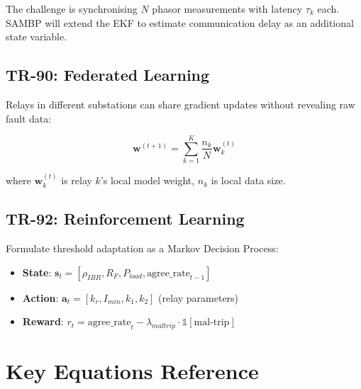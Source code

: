 \documentclass[11pt,a4paper]{report}
\newcommand{\bvec}[1]{\mathbf{#1}}
\begin{document}
The challenge is synchronising $N$ phasor measurements with latency $\tau_k$ each. SAMBP will extend the EKF to estimate communication delay as an additional state variable.

\section{TR-90: Federated Learning}

Relays in different substations can share gradient updates without revealing raw fault data:

\begin{equation}
\bvec{w}^{(t+1)} = \sum_{k=1}^{K}\frac{n_k}{N}\bvec{w}_k^{(t)}
\end{equation}

where $\bvec{w}_k^{(t)}$ is relay $k$'s local model weight, $n_k$ is local data size.

\section{TR-92: Reinforcement Learning}

Formulate threshold adaptation as a Markov Decision Process:
\begin{itemize}
  \item \textbf{State}: $\bvec{s}_t = [\rho_{IBR}, R_F, P_{load}, \text{agree\_rate}_{t-1}]$
  \item \textbf{Action}: $\bvec{a}_t = [k_r, I_{min}, k_1, k_2]$ (relay parameters)
  \item \textbf{Reward}: $r_t = \text{agree\_rate}_t - \lambda_{maltrip}\cdot\mathbb{1}[\text{mal-trip}]$
\end{itemize}

\appendix

\chapter{Key Equations Reference}
\label{app:equations}
\end{document}
